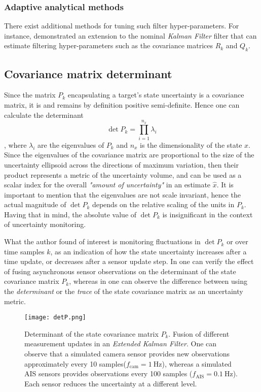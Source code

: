 \subsubsection{Adaptive analytical methods}
There exist additional methods for tuning such filter hyper-parameters. For instance, \cite{Zhou1989,Ljung1979,} demonstrated an extension to the nominal  \emph{Kalman Filter} filter that can estimate filtering hyper-parameters such as the covariance matrices $R_k$ and $Q_k$. 
\subsection{Covariance matrix determinant}\label{ssec:CovMatDet}


Since the matrix $P_k$ encapsulating a target's state uncertainty is a covariance matrix, it is and remains by definition positive semi-definite. Hence one can calculate the determinant $$\det{P_k} = \prod_{i=1}^{n_x} \lambda_i$$ , where $\lambda_i$ are the eigenvalues of $P_k$ and $n_x$ is the dimensionality of the state $x$. Since the eigenvalues of the covariance matrix are proportional to the size of the uncertainty ellipsoid across the directions of maximum variation, then their product represents a metric of the uncertainty volume, and can be used as a scalar index for the overall \textit{"amount of uncertainty"} in an estimate $\hat{x}$. It is important to mention that the eigenvalues are not scale invariant, hence the actual magnitude of $\det{P_k}$ depends on the relative scaling of the units in $P_k$. Having that in mind, the absolute value of $\det{P_k}$ is insignificant in the context of uncertainty monitoring. 

What the author found of interest is monitoring fluctuations in $\det{P_k}$ or over time samples $k$, as an indication of how the state uncertainty increases after a time update, or decreases after a sensor update step. In  one can verify the effect of fusing asynchronous sensor observations on the determinant of the state covariance matrix $P_k$, whereas in  one can observe the difference between using the \emph{determinant} or the \emph{trace} of the state covariance matrix as an uncertainty metric.



\begin{figure}
	\centering
	\texttt{[image: detP.png]}
	\caption{Determinant of the state covariance matrix $P_k$. Fusion of different measurement updates in an \emph{Extended Kalman Filter}. One can observe that a simulated camera sensor provides new observations approximately every 10 samples($f_{\text{cam}} = \SI{1}{\Hz}$), whereas a simulated AIS sensors provides observations every 100 samples ($f_{\text{AIS}} = \SI{0.1}{\Hz}$). Each sensor reduces the uncertainty at a different level.}
	\label{fig:detp}
\end{figure}

